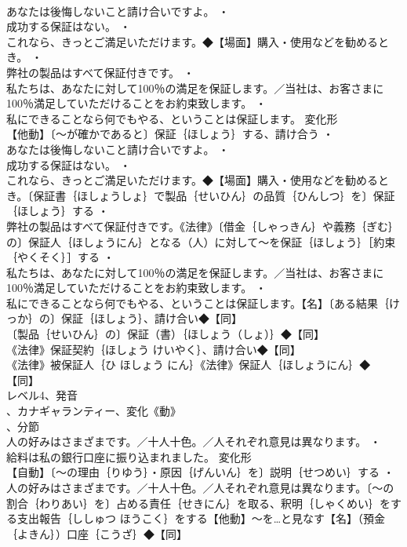 \documentclass[8pt]{extreport}
\begin{document}
\begin{CJK}{UTF8}{min}
\\	あなたは後悔しないこと請け合いですよ。 ・
\\	成功する保証はない。 ・
\\	これなら、きっとご満足いただけます。◆【場面】購入・使用などを勧めるとき。 ・
\\	弊社の製品はすべて保証付きです。 ・
\\	私たちは、あなたに対して100％の満足を保証します。／当社は、お客さまに100％満足していただけることをお約束致します。 ・
\\	私にできることなら何でもやる、ということは保証します。	変化形 
\\	【他動】〔～が確かであると〕保証｛ほしょう｝する、請け合う ・
\\	あなたは後悔しないこと請け合いですよ。 ・
\\	成功する保証はない。 ・
\\	これなら、きっとご満足いただけます。◆【場面】購入・使用などを勧めるとき。〔保証書｛ほしょうしょ｝で製品｛せいひん｝の品質｛ひんしつ｝を〕保証｛ほしょう｝する ・
\\	弊社の製品はすべて保証付きです。《法律》〔借金｛しゃっきん｝や義務｛ぎむ｝の〕保証人｛ほしょうにん｝となる（人）に対して～を保証｛ほしょう｝［約束｛やくそく｝］する ・
\\	私たちは、あなたに対して100％の満足を保証します。／当社は、お客さまに100％満足していただけることをお約束致します。 ・
\\	私にできることなら何でもやる、ということは保証します。【名】〔ある結果｛けっか｝の〕保証｛ほしょう｝、請け合い◆【同】
\\	〔製品｛せいひん｝の〕保証（書）｛ほしょう（しょ）｝◆【同】
\\	《法律》保証契約｛ほしょう けいやく｝、請け合い◆【同】
\\	《法律》被保証人｛ひ ほしょう にん｝《法律》保証人｛ほしょうにん｝◆【同】
\\	レベル4、発音
\\	、カナギャランティー、変化《動》
\\	、分節
\\	人の好みはさまざまです。／十人十色。／人それぞれ意見は異なります。 ・
\\	給料は私の銀行口座に振り込まれました。	変化形 
\\	【自動】〔～の理由｛りゆう｝・原因｛げんいん｝を〕説明｛せつめい｝する ・
\\	人の好みはさまざまです。／十人十色。／人それぞれ意見は異なります。〔～の割合｛わりあい｝を〕占める責任｛せきにん｝を取る、釈明｛しゃくめい｝をする支出報告｛ししゅつ ほうこく｝をする【他動】～を…と見なす【名】（預金｛よきん｝）口座｛こうざ｝◆【同】

\end{CJK}
\end{document}
